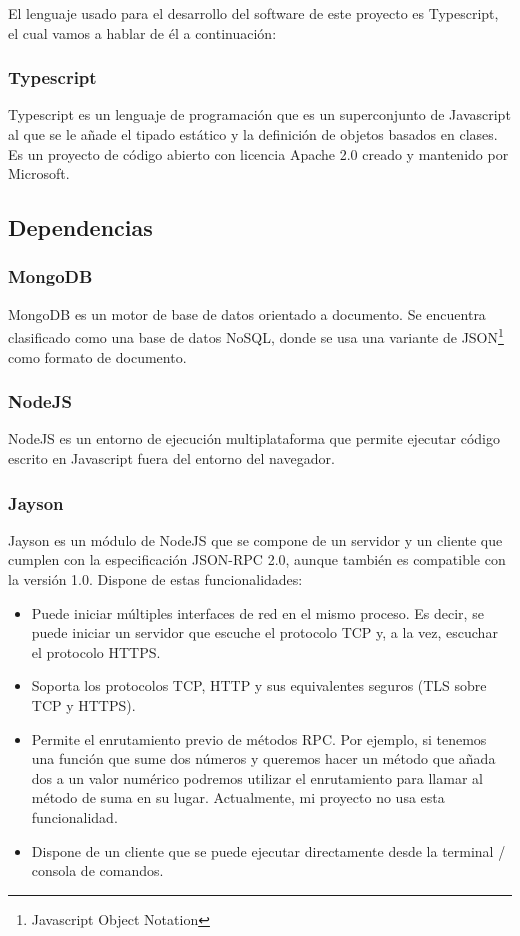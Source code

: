 \documentclass[spanish,12pt, a4paper, twoside]{paper}
\begin{document}
El lenguaje usado para el desarrollo del software de este proyecto es Typescript, el cual vamos a hablar de él a continuación:

\subsubsection{Typescript}

Typescript es un lenguaje de programación que es un superconjunto de Javascript al que se le añade el tipado estático y la definición de objetos basados en clases. Es un proyecto de código abierto con licencia Apache 2.0 creado y mantenido por Microsoft.

\subsection{Dependencias}

\subsubsection{MongoDB}

MongoDB es un motor de base de datos orientado a documento. Se encuentra clasificado como una base de datos NoSQL, donde se usa una variante de JSON\footnote{Javascript Object Notation} como formato de documento.

\subsubsection{NodeJS}

NodeJS es un entorno de ejecución multiplataforma que permite ejecutar código escrito en Javascript fuera del entorno del navegador.

\subsubsection{Jayson}

Jayson es un módulo de NodeJS que se compone de un servidor y un cliente que cumplen con la especificación JSON-RPC 2.0, aunque también es compatible con la versión 1.0. Dispone de estas funcionalidades:

\begin{itemize}
\item Puede iniciar múltiples interfaces de red en el mismo proceso. Es decir, se puede iniciar un servidor que escuche el protocolo TCP y, a la vez, escuchar el protocolo HTTPS.
\item Soporta los protocolos TCP, HTTP y sus equivalentes seguros (TLS sobre TCP y HTTPS).
\item Permite el enrutamiento previo de métodos RPC. Por ejemplo, si tenemos una función que sume dos números y queremos hacer un método que añada dos a un valor numérico podremos utilizar el enrutamiento para llamar al método de suma en su lugar. Actualmente, mi proyecto no usa esta funcionalidad.
\item Dispone de un cliente que se puede ejecutar directamente desde la terminal / consola de comandos.
\end{itemize}
\end{document}
